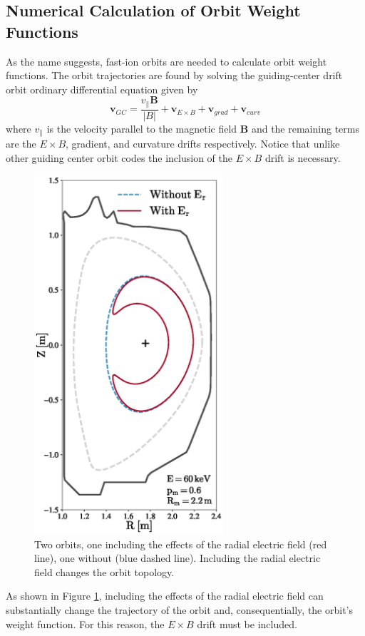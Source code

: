 \subsection{Numerical Calculation of Orbit Weight Functions}
As the name suggests, fast-ion orbits are needed to calculate orbit weight functions. The orbit trajectories are found by solving the guiding-center drift orbit ordinary differential equation given by
\begin{equation}\label{eq:gc_ode}
    \mathbf{v}_{GC} = \frac{v_{\parallel}\mathbf{B}}{|B|} + \mathbf{v}_{E \times B} + \mathbf{v}_{grad} + \mathbf{v}_{curv}
\end{equation}
where $v_{\parallel}$ is the velocity parallel to the magnetic field $\mathbf{B}$ and the remaining terms are the $E\times B$, gradient, and curvature drifts respectively. Notice that unlike other guiding center orbit codes the inclusion of the $E \times B$ drift is necessary.
\begin{figure}[h!]
    \centering
    \includegraphics[width=7cm]{figures/orbit_er.eps}
    \caption{Two orbits, one including the effects of the radial electric field (red line), one without (blue dashed line). Including the radial electric field changes the orbit topology.}
    \label{fig:orbit_er}
\end{figure}
As shown in Figure \ref{fig:orbit_er}, including the effects of the radial electric field can substantially change the trajectory of the orbit and, consequentially, the orbit's weight function. For this reason, the $E \times B$ drift must be included.


